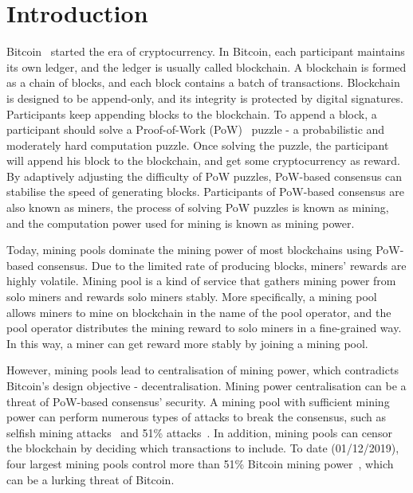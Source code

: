 \section{Introduction}
\label{sec:intro}

Bitcoin~\cite{nakamoto2008bitcoin} started the era of cryptocurrency.
In Bitcoin, each participant maintains its own ledger, and the ledger is usually called blockchain.
A blockchain is formed as a chain of blocks, and each block contains a batch of transactions.
Blockchain is designed to be append-only, and its integrity is protected by digital signatures.
Participants keep appending blocks to the blockchain.
To append a block, a participant should solve a Proof-of-Work (PoW)~\cite{dwork1992pricing} puzzle - a probabilistic and moderately hard computation puzzle.
Once solving the puzzle, the participant will append his block to the blockchain, and get some cryptocurrency as reward.
By adaptively adjusting the difficulty of PoW puzzles, PoW-based consensus can stabilise the speed of generating blocks.
Participants of PoW-based consensus are also known as miners, the process of solving PoW puzzles is known as mining, and the computation power used for mining is known as mining power.

Today, mining pools dominate the mining power of most blockchains using PoW-based consensus.
Due to the limited rate of producing blocks, miners' rewards are highly volatile.
Mining pool is a kind of service that gathers mining power from solo miners and rewards solo miners stably.
More specifically, a mining pool allows miners to mine on blockchain in the name of the pool operator, and the pool operator distributes the mining reward to solo miners in a fine-grained way.
In this way, a miner can get reward more stably by joining a mining pool.

However, mining pools lead to centralisation of mining power, which contradicts Bitcoin's design objective - decentralisation.
Mining power centralisation can be a threat of PoW-based consensus' security.
A mining pool with sufficient mining power can perform numerous types of attacks to break the consensus, such as selfish mining attacks~\cite{eyal2018majority} and 51\% attacks~\cite{nakamoto2008bitcoin}.
In addition, mining pools can censor the blockchain by deciding which transactions to include.
To date (01/12/2019), four largest mining pools control more than 51\% Bitcoin mining power~\cite{btc-com}, which can be a lurking threat of Bitcoin.




